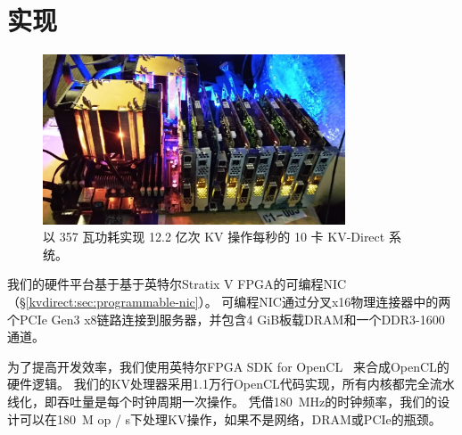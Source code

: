 \section{实现}
\label{kvdirect:sec:implementation}



\begin{figure}[htbp]
	\centering
	\includegraphics[width=0.8\textwidth]{figure/kvdirect_photo.jpg}
	\caption{以 357 瓦功耗实现 12.2 亿次 KV 操作每秒的 10 卡 KV-Direct 系统。}
	\label{kvdirect:fig:photo}
\end{figure}

我们的硬件平台基于基于英特尔Stratix V FPGA的可编程NIC（\S \ref {kvdirect:sec:programmable-nic}）。
可编程NIC通过分叉x16物理连接器中的两个PCIe Gen3 x8链路连接到服务器，并包含4 GiB板载DRAM和一个DDR3-1600通道。

为了提高开发效率，我们使用英特尔FPGA SDK for OpenCL~ \cite {aoc}来合成OpenCL的硬件逻辑。
我们的KV处理器采用1.1万行OpenCL代码实现，所有内核都完全流水线化，即吞吐量是每个时钟周期一次操作。
凭借180~MHz的时钟频率，我们的设计可以在180~M op / s下处理KV操作，如果不是网络，DRAM或PCIe的瓶颈。
%


